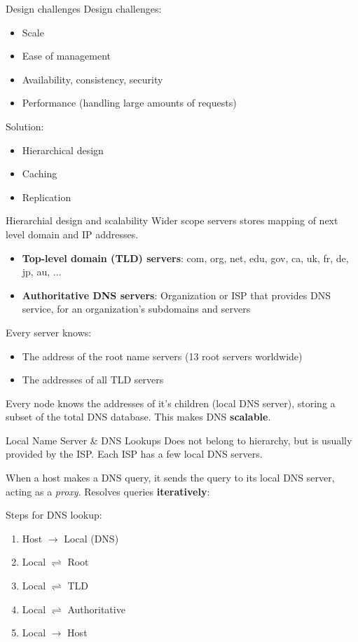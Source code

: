 \begin{knBox}
    {Design challenges}
    Design challenges:
    \begin{itemize}
        \item Scale
        \item Ease of management
        \item Availability, consistency, security
        \item Performance (handling large amounts of requests)
    \end{itemize}

    Solution:
    \begin{itemize}
        \item Hierarchical design
        \item Caching
        \item Replication
    \end{itemize}
\end{knBox}

\begin{theorem}
    {Hierarchial design and scalability}
    Wider scope servers stores mapping of next level domain and IP addresses.
    \begin{itemize}
        \item \textbf{Top-level domain (TLD) servers}: com, org, net, edu, gov, ca, uk, fr, de, jp, au, ...
        \item \textbf{Authoritative DNS servers}: Organization or ISP that provides DNS service, for an organization's subdomains and servers
    \end{itemize}
    Every server knows:
    \begin{itemize}
        \item The address of the root name servers (13 root servers worldwide)
        \item The addresses of all TLD servers
    \end{itemize}
    Every node knows the addresses of it's children (local DNS server), storing a subset of the total DNS database. This makes DNS \textbf{scalable}.
\end{theorem}

\begin{theorem}
    {Local Name Server \& DNS Lookups}
    Does not belong to hierarchy, but is usually provided by the ISP. Each ISP has a few local DNS servers.

    When a host makes a DNS query, it sends the query to its local DNS server, acting as a \textit{proxy}. Resolves queries \textbf{iteratively}:

    Steps for DNS lookup:
    \begin{enumerate}
        \item Host $\to$ Local (DNS)
        \item Local $\rightleftharpoons$ Root
        \item Local $\rightleftharpoons$ TLD
        \item Local $\rightleftharpoons$ Authoritative
        \item Local $\to$ Host
    \end{enumerate}
\end{theorem}

